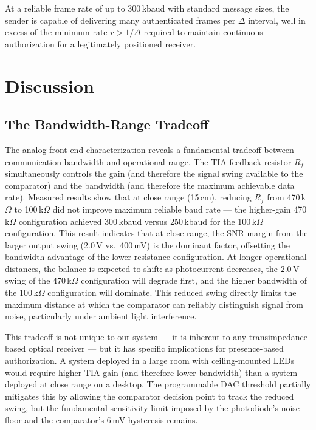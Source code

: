 \documentclass[conference]{IEEEtran}
\begin{document}
At a reliable frame rate of up to 300\,kbaud with standard message sizes, the sender is capable of delivering many authenticated frames per $\Delta$ interval, well in excess of the minimum rate $r > 1/\Delta$ required to maintain continuous authorization for a legitimately positioned receiver.

\section{Discussion}
\label{sec:discussion}

\subsection{The Bandwidth-Range Tradeoff}

The analog front-end characterization reveals a fundamental tradeoff between communication bandwidth and operational range. The TIA feedback resistor $R_f$ simultaneously controls the gain (and therefore the signal swing available to the comparator) and the bandwidth (and therefore the maximum achievable data rate). Measured results show that at close range (15\,cm), reducing $R_f$ from 470\,k$\Omega$ to 100\,k$\Omega$ did not improve maximum reliable baud rate — the higher-gain 470\,k$\Omega$ configuration achieved 300\,kbaud versus 250\,kbaud for the 100\,k$\Omega$ configuration. This result indicates that at close range, the SNR margin from the larger output swing (2.0\,V vs.\ 400\,mV) is the dominant factor, offsetting the bandwidth advantage of the lower-resistance configuration. At longer operational distances, the balance is expected to shift: as photocurrent decreases, the 2.0\,V swing of the 470\,k$\Omega$ configuration will degrade first, and the higher bandwidth of the 100\,k$\Omega$ configuration will dominate. This reduced swing directly limits the maximum distance at which the comparator can reliably distinguish signal from noise, particularly under ambient light interference.

This tradeoff is not unique to our system --- it is inherent to any transimpedance-based optical receiver --- but it has specific implications for presence-based authorization. A system deployed in a large room with ceiling-mounted LEDs would require higher TIA gain (and therefore lower bandwidth) than a system deployed at close range on a desktop. The programmable DAC threshold partially mitigates this by allowing the comparator decision point to track the reduced swing, but the fundamental sensitivity limit imposed by the photodiode's noise floor and the comparator's 6\,mV hysteresis remains.
\end{document}
